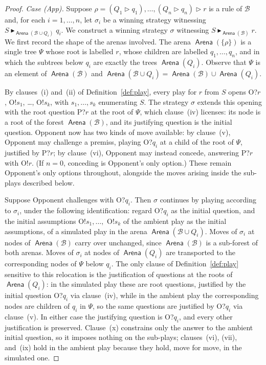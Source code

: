 \documentclass{lipics-v2021}
\newcommand{\wstrat}[1]{\blacktriangleright_{#1}}            %
\newcommand{\base}[1]{\mathcal{#1}}                    %
\newcommand{\brule}[1]{\triangleright{#1}}         %
\newcommand{\toarena}[1]{\mathrel{\textsf{Arena}}(#1)}           %
\begin{document}
\begin{proof}
\medskip
 
\noindent\emph{Case (App).} Suppose
$\rho = (Q_1 \brule q_1), \ldots, (Q_n \brule q_n) \brule r$ is a rule of
$\base{B}$ and, for each $i = 1, \ldots, n$, let $\sigma_i$ be a winning
strategy witnessing $S \wstrat{\toarena{\base{B} \cup Q_i}} q_i$. We
construct a winning strategy $\sigma$ witnessing
$S \wstrat{\toarena{\base{B}}} r$. We first record the shape of the arenas involved. The arena $\toarena{\{\rho\}}$ is a single
tree $\Psi$ whose root is labelled $r$, whose children are labelled
$q_1, \ldots, q_n$, and in which the subtrees below $q_i$ are exactly the
trees $\toarena{Q_i}$. Observe that
$\Psi$ is an element of $\toarena{\base{B}}$ and
$\toarena{\base{B} \cup Q_i} = \toarena{\base{B}} \cup \toarena{Q_i}$.
 
By clauses~(i) and~(ii) of Definition~\ref{def:play}, every play for $r$ from
$S$ opens O?$r$, O!$s_1$, \ldots, O!$s_k$, with $s_1, \ldots, s_k$
enumerating $S$. The strategy $\sigma$ extends this opening with the root
question P?$r$ at the root of $\Psi$, which clause~(iv) licenses: its node is
a root of the forest $\toarena{\base{B}}$, and its justifying question is the
initial question. Opponent now has two kinds of move available: by
clause~(v), Opponent may challenge a premiss, playing O?$q_i$ at a child of
the root of $\Psi$, justified by P?$r$; by clause~(vi), Opponent may instead
concede, answering P?$r$ with O!$r$. (If $n = 0$, conceding is Opponent's
only option.) These remain Opponent's only options throughout, alongside the
moves arising inside the sub-plays described below.
 
Suppose Opponent challenges with O?$q_i$. Then $\sigma$ continues by playing
according to $\sigma_i$, under the following identification: regard O?$q_i$
as the initial question, and the initial assumptions
O!$s_1, \ldots,$ O!$s_k$ of the ambient play as the initial assumptions, of a
simulated play in the arena $\toarena{\base{B} \cup Q_i}$. Moves of
$\sigma_i$ at nodes of $\toarena{\base{B}}$ carry over unchanged, since
$\toarena{\base{B}}$ is a sub-forest of both arenas. Moves of $\sigma_i$ at
nodes of $\toarena{Q_i}$ are transported to the corresponding nodes of $\Psi$
below $q_i$. The only clause of Definition~\ref{def:play} sensitive to this
relocation is the justification of questions at the roots of
$\toarena{Q_i}$: in the simulated play these are root questions, justified by
the initial question O?$q_i$ via clause~(iv), while in the ambient play the
corresponding nodes are children of $q_i$ in $\Psi$, so the same questions
are justified by O?$q_i$ via clause~(v). In either case the justifying
question is O?$q_i$, and every other justification is preserved. Clause~(x)
constrains only the answer to the ambient initial question, so it imposes
nothing on the sub-plays; clauses~(vi), (vii), and~(ix) hold in the ambient
play because they hold, move for move, in the simulated one.
 

\end{proof}
\end{document}
